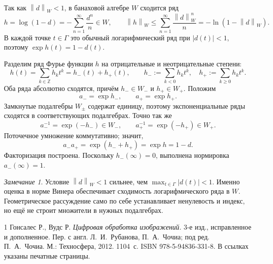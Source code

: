 \documentclass[12pt,a4paper]{article}
\theoremstyle{definition}
\theoremstyle{remark}
\newtheorem*{remark}{Замечание}
\newcommand{\ZZ}{\mathbb{Z}}
\newcommand{\norm}[1]{\left\lVert #1\right\rVert}
\begin{document}
Так как $\norm{d}_W<1$, в банаховой алгебре $W$ сходится ряд
\[
  h=\log(1-d)=-\sum_{n=1}^{\infty}\frac{d^n}{n}\in W,
  \qquad
  \norm{h}_W\leqslant\sum_{n=1}^{\infty}\frac{\norm{d}_W^n}{n}
  =-\ln(1-\norm{d}_W).
\]
В каждой точке $t\in\Gamma$ это обычный логарифмический ряд при
$|d(t)|<1$, поэтому $\exp h(t)=1-d(t)$.

Разделим ряд Фурье функции $h$ на отрицательные и неотрицательные степени:
\[
  h(t)=\sum_{k\in\ZZ}h_kt^k=h_-(t)+h_+(t),\qquad
  h_-\!:=\sum_{k<0}h_kt^k,\quad h_+\!:=\sum_{k\geqslant0}h_kt^k.
\]
Оба ряда абсолютно сходятся, причём $h_-\in W_-$ и $h_+\in W_+$.
Положим
\[
  a_-=\exp h_-,\qquad a_+=\exp h_+.
\]
Замкнутые подалгебры $W_\pm$ содержат единицу, поэтому
экспоненциальные ряды сходятся в соответствующих подалгебрах.
Точно так же
\[
  a_-^{-1}=\exp(-h_-)\in W_-,\qquad
  a_+^{-1}=\exp(-h_+)\in W_+.
\]
Поточечное умножение коммутативно; значит,
\[
  a_-a_+=\exp(h_-+h_+)=\exp h=1-d.
\]
Факторизация построена. Поскольку $h_-(\infty)=0$, выполнена
нормировка $a_-(\infty)=1$.

\begin{remark}
Условие $\norm{d}_W<1$ сильнее, чем $\max_{t\in\Gamma}|d(t)|<1$.
Именно оценка в норме Винера обеспечивает сходимость логарифмического
ряда в $W$. Геометрическое рассуждение само по себе устанавливает
ненулевость и индекс, но ещё не строит множители в нужных подалгебрах.
\end{remark}

\begingroup
\small
\begin{thebibliography}{1}
Гонсалес Р., Вудс Р.
\emph{Цифровая обработка изображений.}
3-е изд., исправленное и дополненное.
Пер. с англ. Л.~И.~Рубанова, П.~А.~Чочиа;
под ред. П.~А.~Чочиа. М.: Техносфера, 2012. 1104~с.
ISBN 978-5-94836-331-8.
В ссылках указаны печатные страницы.
\end{thebibliography}
\endgroup
\end{document}
